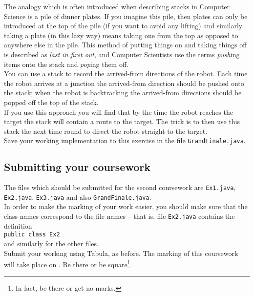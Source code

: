 \noindent
The analogy which is often introduced when describing stacks in Computer 
Science is a pile of dinner plates. If you imagine this pile, then plates can
only be introduced at the top of the pile (if you want to avoid any lifting)
and similarly taking a plate (in this lazy way) means taking one from 
the top as opposed to anywhere else in the pile. This method of putting 
things on and taking things off is described as {\em last in first out}, and 
Computer Scientists use the terms {\em push}ing items onto the stack and 
{\em pop}ing them off. \\

\noindent
You can use a stack to record the arrived-from directions of the robot. Each
time the robot arrives at a junction the arrived-from direction should 
be pushed onto the stack; when the robot is backtracking the arrived-from 
directions should be popped off the top of the stack. \\

\noindent
If you use this approach you will find that by the time the robot reaches
the target the stack will contain a route to the target. The trick is to 
then use this stack the next time round to direct the robot straight to the 
target.\\

\noindent
Save your working implementation to this exercise in the file 
{\tt GrandFinale.java}.

\subsection{Submitting your coursework}

The files which should be submitted for the second coursework are {\tt Ex1.java},
{\tt Ex2.java}, {\tt Ex3.java} and also {\tt GrandFinale.java}.\\

\noindent
In order to make the marking of your work easier, you should make sure that the
class names correspond to the file names -- that is, file {\tt Ex2.java} 
contains the definition \\

{\tt public class Ex2} \\

\noindent
and similarly for the other files. \\

\noindent
Submit your working using Tabula, as before. The marking of this coursework will take place on
\deadlinetwo. Be there or be square\footnote{In fact, be there 
or get no marks.}.

